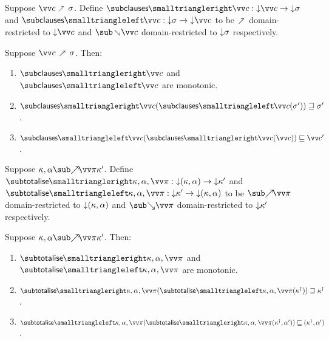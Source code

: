 \begin{definition}
   Suppose $\vec{c} \clauseFwdR \sigma$. Define $\clausesFwdF{\vec{c}}: \Below{\vec{c}} \to \Below{\sigma}$ and $\clausesBwdF{\vec{c}}: \Below{\sigma} \to \Below{\vec{c}}$ to be $\clauseFwdR$ domain-restricted to $\Below{\vec{c}}$ and $\clauseBwdR{\vec{c}}$ domain-restricted to ${\downarrow}{\sigma}$ respectively.
\end{definition}

\begin{lemma}
  \label{lem:aux:clauses:gc}
  Suppose $\vec{c} \clausesFwdR \sigma$. Then:
  \begin{enumerate}
     \item $\clausesFwdF{\vec{c}}$ and $\clausesBwdF{\vec{c}}$ are monotonic.
     \item $\clausesFwdF{\vec{c}}(\clausesBwdF{\vec{c}}(\sigma')) \geq \sigma'$.
     \item $\clausesBwdF{\vec{c}}(\clausesFwdF{\vec{c}}(\vec{c})) \leq \vec{c}'$.
  \end{enumerate}
\end{lemma}

\begin{definition}
   Suppose $\totaliseFwd{\kappa}{\alpha}{\vec{\pi}}{\kappa'}$. Define $\totaliseFwdF{\kappa,\alpha,\vec{\pi}}: \Below{(\kappa,\alpha)} \to \Below{\kappa'}$ and $\totaliseBwdF{\kappa,\alpha,\vec{\pi}}: \Below{\kappa'} \to \Below{(\kappa,\alpha)}$ to be $\totaliseFwdR{\vec{\pi}}$ domain-restricted to ${\downarrow}{(\kappa,\alpha)}$ and $\totaliseBwdR{\vec{\pi}}$ domain-restricted to ${\downarrow}{\kappa'}$ respectively.
\end{definition}

\begin{lemma}
  \label{lem:aux:list-gen:gc}
  \item
  Suppose $\totaliseFwd{\kappa}{\alpha}{\vec{\pi}}{\kappa'}$. Then:
  \begin{enumerate}
     \item \label{lem:aux:totalise:gc:1} $\totaliseFwdF{\kappa,\alpha,\vec{\pi}}$ and $\totaliseBwdF{\kappa,\alpha,\vec{\pi}}$ are monotonic.
     \item \label{lem:aux:totalise:gc:2} $\totaliseFwdF{\kappa,\alpha,\vec{\pi}}(\totaliseBwdF{\kappa,\alpha,\vec{\pi}}(\smash{\kappa^\dagger})) \geq \smash{\kappa^\dagger}$.
     \item \label{lem:aux:totalise:gc:3} $\totaliseBwdF{\kappa,\alpha,\vec{\pi}}(\totaliseFwdF{\kappa,\alpha,\vec{\pi}}(\smash{\kappa^\dagger}, \alpha')) \leq (\smash{\kappa^\dagger}, \alpha')$.
  \end{enumerate}
\end{lemma}
